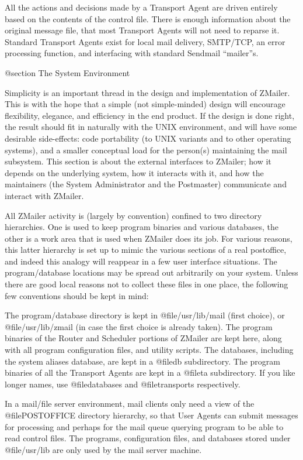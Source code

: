 All the actions and decisions made by a Transport Agent are driven
entirely based on the contents of the control file.
There is enough information about the original message file, that
most Transport Agents will not need to reparse it.
Standard Transport Agents exist for local mail delivery, SMTP/TCP,
an error processing function, and interfacing with standard Sendmail
``mailer''s.

@section The System Environment

Simplicity is an important thread in the design and implementation
of ZMailer.
This is with the hope that a simple (not simple-minded) design will
encourage flexibility, elegance, and efficiency in the end product.
If the design is done right, the result should fit in naturally with
the UNIX environment, and will have some desirable side-effects:
code portability (to UNIX variants and to other operating systems),
and a smaller conceptual load for the person(s) maintaining the mail
subsystem.
This section is about the external interfaces to ZMailer; how it
depends on the underlying system, how it interacts with it, and
how the maintainers (the System Administrator and the Postmaster)
communicate and interact with ZMailer.

All ZMailer activity is (largely by convention) confined to two
directory hierarchies.
One is used to keep program binaries and various databases,
the other is a work area that is used when ZMailer does its job.
For various reasons, this latter hierarchy is set up to mimic
the various sections of a real postoffice, and indeed this
analogy will reappear in a few user interface situations.
The program/database locations may be spread out arbitrarily
on your system.
Unless there are good local reasons not to collect these files
in one place, the following few conventions should be kept in mind:

The program/database directory is kept in @file{/usr/lib/mail}
(first choice), or @file{/usr/lib/zmail} (in case the first choice
is already taken).
The program binaries of the Router and Scheduler portions of
ZMailer are kept here, along with all program configuration
files, and utility scripts.
The databases, including the system aliases database, are kept
in a @file{db} subdirectory.
The program binaries of all the Transport Agents are kept in
a @file{ta} subdirectory.
If you like longer names, use @file{databases} and @file{transports}
respectively.

In a mail/file server environment, mail clients only need a view
of the @file{POSTOFFICE} directory hierarchy, so that User Agents
can submit messages for processing and perhaps for the mail queue
querying program to be able to read control files.
The programs, configuration files, and databases stored under
@file{/usr/lib} are only used by the mail server machine.

